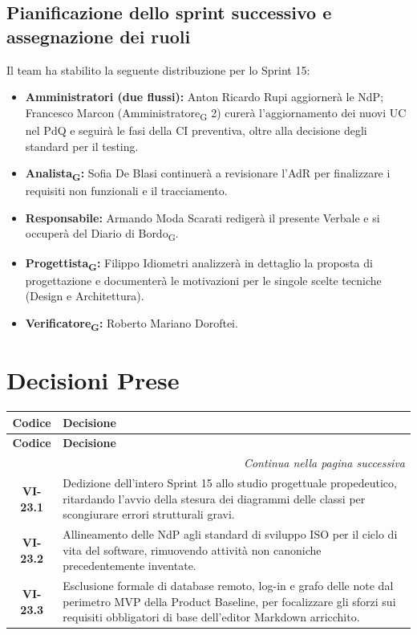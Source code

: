 \subsection{Pianificazione dello sprint successivo e assegnazione dei ruoli}
Il team ha stabilito la seguente distribuzione per lo Sprint 15:
\begin{itemize}
    \item \textbf{Amministratori (due flussi):} Anton Ricardo Rupi aggiornerà le NdP; Francesco Marcon (Amministratore\textsubscript{G} 2) curerà l'aggiornamento dei nuovi UC nel PdQ e seguirà le fasi della CI preventiva, oltre alla decisione degli standard per il testing.
    \item \textbf{Analista\textsubscript{G}:} Sofia De Blasi continuerà a revisionare l'AdR per finalizzare i requisiti non funzionali e il tracciamento.
    \item \textbf{Responsabile:} Armando Moda Scarati redigerà il presente Verbale e si occuperà del Diario di Bordo\textsubscript{G}.
    \item \textbf{Progettista\textsubscript{G}:} Filippo Idiometri analizzerà in dettaglio la proposta di progettazione e documenterà le motivazioni per le singole scelte tecniche (Design e Architettura).
    \item \textbf{Verificatore\textsubscript{G}:} Roberto Mariano Doroftei.
\end{itemize}

\section{Decisioni Prese}

\renewcommand{\arraystretch}{1.3}
\vspace{-0.3cm}
\noindent
\begin{longtable}{c p{12cm}}
	\toprule
	\textbf{Codice} & \textbf{Decisione} \\
	\midrule
	\endfirsthead

	\toprule
	\textbf{Codice} & \textbf{Decisione} \\
	\midrule
	\endhead

	\midrule
	\multicolumn{2}{r}{\textit{Continua nella pagina successiva}} \\
	\midrule
	\endfoot

	\bottomrule
	\endlastfoot

	\textbf{VI-23.1} & {Dedizione dell'intero Sprint 15 allo studio progettuale propedeutico, ritardando l'avvio della stesura dei diagrammi delle classi per scongiurare errori strutturali gravi.} \\
	\textbf{VI-23.2} & {Allineamento delle NdP agli standard di sviluppo ISO per il ciclo di vita del software, rimuovendo attività non canoniche precedentemente inventate.} \\
	\textbf{VI-23.3} & {Esclusione formale di database remoto, log-in e grafo delle note dal perimetro MVP della Product Baseline, per focalizzare gli sforzi sui requisiti obbligatori di base dell'editor Markdown arricchito.} \\

\end{longtable}

